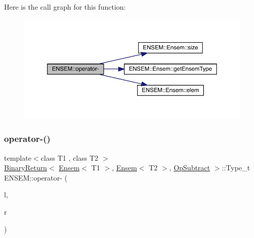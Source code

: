 Here is the call graph for this function\+:\nopagebreak
\begin{figure}[H]
\begin{center}
\leavevmode
\includegraphics[width=350pt]{d1/d9e/group__eensem_ga401760b4a9588007075073995611fa86_cgraph}
\end{center}
\end{figure}
\mbox{\label{group__eensem_gaa7400c6ebea61c6e2869c81ab28d68b0}} 
\subsubsection{\texorpdfstring{operator-\/()}{operator-()}\hspace{0.1cm}{\footnotesize\ttfamily [2/4]}}
{\footnotesize\ttfamily template$<$class T1 , class T2 $>$ \\
\mbox{\hyperlink{structENSEM_1_1BinaryReturn}{Binary\+Return}}$<$ \mbox{\hyperlink{classENSEM_1_1Ensem}{Ensem}}$<$ T1 $>$, \mbox{\hyperlink{classENSEM_1_1Ensem}{Ensem}}$<$ T2 $>$, \mbox{\hyperlink{structENSEM_1_1OpSubtract}{Op\+Subtract}} $>$\+::Type\+\_\+t E\+N\+S\+E\+M\+::operator-\/ (\begin{DoxyParamCaption}\item[{const \mbox{\hyperlink{classENSEM_1_1Ensem}{Ensem}}$<$ T1 $>$ \&}]{l,  }\item[{const \mbox{\hyperlink{classENSEM_1_1Ensem}{Ensem}}$<$ T2 $>$ \&}]{r }\end{DoxyParamCaption})\hspace{0.3cm}{\ttfamily [inline]}}

